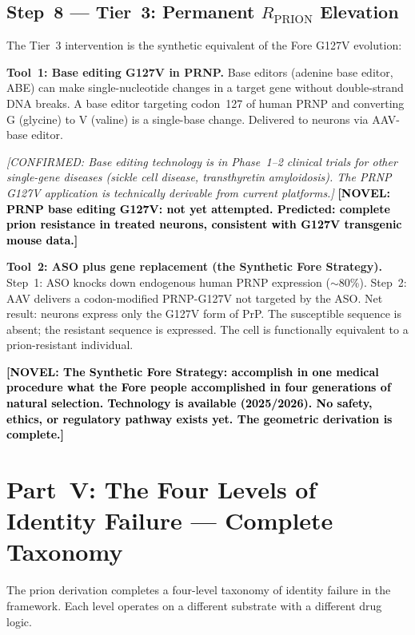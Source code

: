 \documentclass[12pt,a4paper]{article}
\newcommand{\novel}[1]{\textbf{\textcolor{black}{[NOVEL: #1]}}}
\newcommand{\confirmed}[1]{\textit{[CONFIRMED: #1]}}
\begin{document}
\subsection{Step~8 --- Tier~3: Permanent $R_{\mathrm{PRION}}$ Elevation}

The Tier~3 intervention is the synthetic equivalent of the Fore G127V
evolution:

\textbf{Tool~1: Base editing G127V in PRNP.}
Base editors (adenine base editor, ABE) can make single-nucleotide changes
in a target gene without double-strand DNA breaks. A base editor targeting
codon~127 of human PRNP and converting G (glycine) to V (valine) is a
single-base change. Delivered to neurons via AAV-base editor.

\confirmed{Base editing technology is in Phase~1--2 clinical trials for
other single-gene diseases (sickle cell disease, transthyretin amyloidosis).
The PRNP G127V application is technically derivable from current platforms.}
\novel{PRNP base editing G127V: not yet attempted. Predicted: complete prion
resistance in treated neurons, consistent with G127V transgenic mouse data.}

\textbf{Tool~2: ASO plus gene replacement (the Synthetic Fore Strategy).}
Step~1: ASO knocks down endogenous human PRNP expression ($\sim$80\%).
Step~2: AAV delivers a codon-modified PRNP-G127V not targeted by the ASO.
Net result: neurons express only the G127V form of PrP. The susceptible
sequence is absent; the resistant sequence is expressed. The cell is
functionally equivalent to a prion-resistant individual.

\novel{The Synthetic Fore Strategy: accomplish in one medical procedure what
the Fore people accomplished in four generations of natural selection.
Technology is available (2025/2026). No safety, ethics, or regulatory
pathway exists yet. The geometric derivation is complete.}

\section{Part~V: The Four Levels of Identity Failure --- Complete Taxonomy}

The prion derivation completes a four-level taxonomy of identity failure in
the framework. Each level operates on a different substrate with a different
drug logic.
\end{document}
